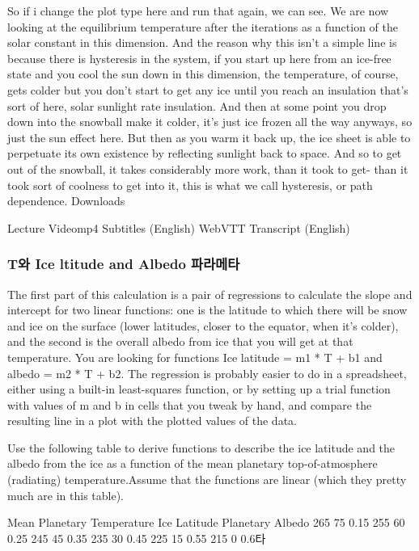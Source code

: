 So if i change the plot type here and run that again, we can see. We are now looking at the equilibrium temperature after the iterations as a function of the solar constant in this dimension. And the reason why this isn't a simple line is because there is hysteresis in the system, if you start up here from an ice-free state and you cool the sun down in this dimension, the temperature, of course, gets colder but you don't start to get any ice until you reach an insulation that's sort of here, solar sunlight rate insulation. And then at some point you drop down into the snowball make it colder, it's just ice frozen all the way anyways, so just the sun effect here. But then as you warm it back up, the ice sheet is able to perpetuate its own existence by reflecting sunlight back to space. And so to get out of the snowball, it takes considerably more work, than it took to get- than it took sort of coolness to get into it, this is what we call hysteresis, or path dependence. 
Downloads

Lecture Videomp4
Subtitles (English)
WebVTT
Transcript (English)


\subsubsection{T와 Ice ltitude and Albedo 파라메타}\index{}

The first part of this calculation is a pair of regressions to calculate the slope and intercept for two linear functions: one is the latitude to which there will be snow and ice on the surface (lower latitudes, closer to the equator, when it’s colder), and the second is the overall albedo from ice that you will get at that temperature. You are looking for functions Ice latitude = m1 * T + b1 and albedo = m2 * T + b2. The regression is probably easier to do in a spreadsheet, either using a built-in least-squares function, or by setting up a trial function with values of m and b in cells that you tweak by hand, and compare the resulting line in a plot with the plotted values of the data.

Use the following table to derive functions to describe the ice latitude and the albedo from the ice as a function of the mean planetary top-of-atmosphere (radiating) temperature.Assume that the functions are linear (which they pretty much are in this table).

Mean Planetary Temperature	Ice Latitude	Planetary Albedo
265	75	0.15
255	60	0.25
245	45	0.35
235	30	0.45
225	15	0.55
215	0	0.6타

